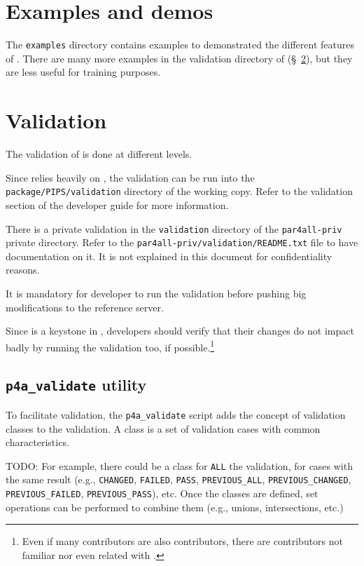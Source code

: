 \documentclass[a4paper]{article}
\begin{document}
\section{Examples and demos}
\label{sec:examples-demos}

The \texttt{examples} directory contains examples to demonstrated the
different features
of \Apfa. There are many more examples in the validation directory of \Apfa
(\S~\ref{sec:validation}), but they are less useful for training
purposes.

\section{Validation}
\label{sec:validation}

The validation of \Apfa is done at different levels.

Since \Apfa relies heavily on \Apips, the \Apips validation can be run
into the \texttt{package/PIPS/validation} directory of the \Agit working
copy. Refer to the validation section of the \Apips developer guide for
more information.

There is a private validation in the \texttt{validation} directory of the
\texttt{par4all-priv} private directory. Refer to the
\texttt{par4all-priv/validation/README.txt} file to have documentation on
it. It is not explained in this document for confidentiality reasons.

It is mandatory for \Apfa developer to run the validation before pushing
big modifications to the reference \Agit server.

Since \Apips is a keystone in \Apfa, \Apips developers should verify that
their changes do not impact badly \Apfa by running the validation too, if
possible.\footnote{Even if many \Apips contributors are also \Apfa
  contributors, there are \Apips contributors not familiar nor even
  related with \Apfa.}


\subsection{\protect\texttt{p4a\_validate} utility}
\label{sec:p4a_validate-utility}


To facilitate validation, the \verb|p4a_validate|
script adds the concept of validation classes to the \Apips
validation. A class is a set of validation cases with common characteristics.

TODO: For example, there could be a class for \texttt{ALL} the
validation, for cases with the same result (e.g.,
\texttt{CHANGED}, \texttt{FAILED}, \texttt{PASS}, \verb|PREVIOUS_ALL|,
\verb|PREVIOUS_CHANGED|, \verb|PREVIOUS_FAILED|, \verb|PREVIOUS_PASS|),
etc. Once the classes are defined, set operations can be performed to combine
them (e.g., unions, intersections, etc.)
\end{document}

